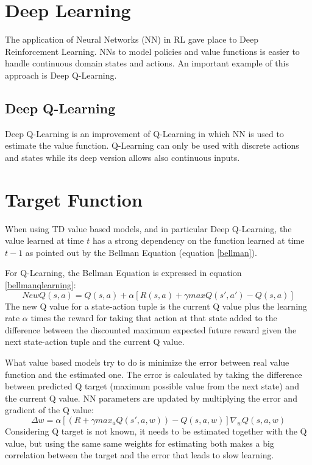 \documentclass[Lau,oneside,noexaminfo]{sapthesis} %
\begin{document}
\section{Deep Learning}
The application of Neural Networks (NN) in RL gave place to Deep Reinforcement Learning. NNs to model policies and value functions is easier to handle continuous domain states and actions. An important example of this approach is Deep Q-Learning.
\subsection{Deep Q-Learning}
Deep Q-Learning is an improvement of Q-Learning in which NN is used to estimate the value function. Q-Learning can only be used with discrete actions and states while its deep version allows also continuous inputs.
\section{Target Function}
When using TD value based models, and in particular Deep Q-Learning, the value learned at time $t$ has a strong dependency on the function learned at time $t-1$ as pointed out by the Bellman Equation (equation \ref{bellman}).  

For Q-Learning, the Bellman Equation is expressed in equation \ref{bellmanqlearning}:
\begin{equation}
NewQ( s,a ) = Q( s,a ) + \alpha [ R(s,a) + \gamma maxQ(s',a') - Q(s,a) ]
\label{bellmanqlearning}
\end{equation}
The new Q value for a state-action tuple is the current Q value plus the learning rate $\alpha$ times the reward for taking that action at that state added to the difference between the discounted  maximum expected future reward given the next state-action tuple and the current Q value. 

What value based models try to do is minimize the error between real value function and the estimated one. The error is calculated by taking the difference between predicted Q target (maximum possible value from the next state) and the current Q value. NN parameters are updated by multiplying the error and gradient of the Q value:
\begin{equation}
\Delta w = \alpha [ (R + \gamma max_a Q(s',a,w)) - Q(s,a,w)] \nabla_w Q( s,a,w )
\end{equation}
Considering Q target is not known, it needs to be estimated together with the Q value, but using the same same weights for estimating both makes a big correlation between the target and the error that leads to slow learning. 
\end{document}
